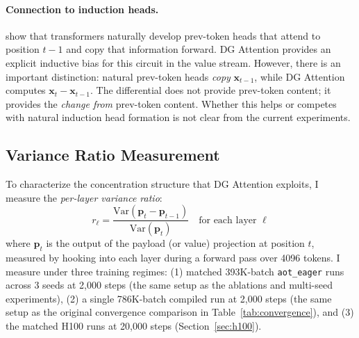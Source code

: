 \documentclass[11pt]{article}
\begin{document}
\paragraph{Connection to induction heads.}
\citet{olsson2022induction} show that transformers naturally develop prev-token heads that attend to position $t-1$ and copy that information forward. DG Attention provides an explicit inductive bias for this circuit in the value stream. However, there is an important distinction: natural prev-token heads \emph{copy} $\mathbf{x}_{t-1}$, while DG Attention computes $\mathbf{x}_t - \mathbf{x}_{t-1}$. The differential does not provide prev-token content; it provides the \emph{change from} prev-token content. Whether this helps or competes with natural induction head formation is not clear from the current experiments.

\subsection{Variance Ratio Measurement}
\label{sec:varratio}

To characterize the concentration structure that DG Attention exploits, I measure the \emph{per-layer variance ratio}:
\begin{equation}
    r_\ell = \frac{\text{Var}(\mathbf{p}_t - \mathbf{p}_{t-1})}{\text{Var}(\mathbf{p}_t)} \quad \text{for each layer } \ell
    \label{eq:varratio}
\end{equation}
where $\mathbf{p}_t$ is the output of the payload (or value) projection at position $t$, measured by hooking into each layer during a forward pass over 4096 tokens. I measure under three training regimes: (1) matched 393K-batch \texttt{aot\_eager} runs across 3 seeds at 2{,}000 steps (the same setup as the ablations and multi-seed experiments), (2) a single 786K-batch compiled run at 2{,}000 steps (the same setup as the original convergence comparison in Table~\ref{tab:convergence}), and (3) the matched H100 runs at 20{,}000 steps (Section~\ref{sec:h100}).
\end{document}
